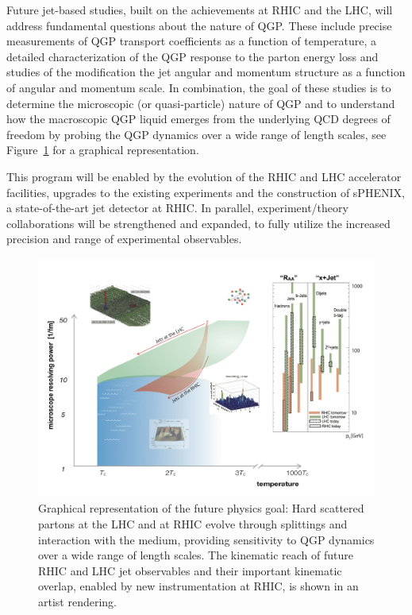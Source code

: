 Future jet-based studies, built on the achievements at RHIC and the LHC, will 
address fundamental questions about the nature of QGP. These include 
precise measurements of QGP transport coefficients as a function of 
temperature, a detailed characterization of the QGP response to the 
parton energy loss and studies of the modification the jet angular 
and momentum structure as a function of angular and momentum scale. 
In combination, the goal of these studies is to determine the 
microscopic (or quasi-particle) nature of QGP 
and to understand how the macroscopic QGP liquid emerges from the 
underlying QCD degrees of freedom by probing the QGP dynamics over a wide range of length scales, see Figure\ \ref{Fig:HardProbesFuture} for a graphical representation.

This program will be enabled by the evolution of the RHIC and LHC 
accelerator facilities, upgrades to the existing experiments and the 
construction of sPHENIX, a state-of-the-art jet detector at RHIC. In 
parallel, experiment/theory collaborations will be strengthened 
and expanded, to fully utilize the increased precision and range of 
experimental observables. 

\begin{figure}[t]
\includegraphics[width=1.05\textwidth]{fig/HardProbesFuture}
\caption[Graphical representation of a future physics goal]{Graphical representation of the future physics goal: Hard scattered partons at the LHC and at RHIC evolve through splittings and interaction with the medium, providing sensitivity to QGP dynamics over a wide range of length scales. The kinematic reach of future RHIC and LHC jet observables and their important kinematic overlap, enabled by new instrumentation at RHIC, is shown in an artist rendering.}
\label{Fig:HardProbesFuture}
\end{figure}

